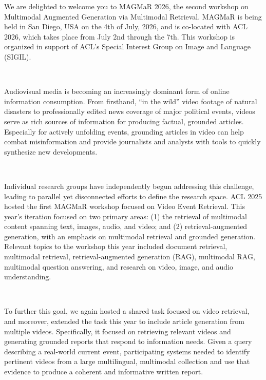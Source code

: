 We are delighted to welcome you to MAGMaR 2026, the second workshop on Multimodal Augmented Generation via Multimodal Retrieval. MAGMaR is being held in San Diego, USA on the 4th of July, 2026, and is co-located with ACL 2026, which takes place from July 2nd through the 7th. This workshop is organized in support of ACL's Special Interest Group on Image and Language (SIGIL).

$ $\par

Audiovisual media is becoming an increasingly dominant form of online information consumption. From firsthand, ``in the wild'' video footage of natural disasters to professionally edited news coverage of major political events, videos serve as rich sources of information for producing factual, grounded articles. Especially for actively unfolding events, grounding articles in video can help combat misinformation and provide journalists and analysts with tools to quickly synthesize new developments.

$ $\par

Individual research groups have independently begun addressing this challenge, leading to parallel yet disconnected efforts to define the research space. ACL 2025 hosted the first MAGMaR workshop focused on Video Event Retrieval. This year's iteration focused on two primary areas: (1) the retrieval of multimodal content spanning text, images, audio, and video; and (2) retrieval-augmented generation, with an emphasis on multimodal retrieval and grounded generation. Relevant topics to the workshop this year included document retrieval, multimodal retrieval, retrieval-augmented generation (RAG), multimodal RAG, multimodal question answering, and research on video, image, and audio understanding.

$ $\par

To further this goal, we again hosted a shared task focused on video retrieval, and moreover, extended the task this year to include article generation from multiple videos. Specifically, it focused on retrieving relevant videos and generating grounded reports that respond to information needs. Given a query describing a real-world current event, participating systems needed to identify pertinent videos from a large multilingual, multimodal collection and use that evidence to produce a coherent and informative written report.

$ $\par


